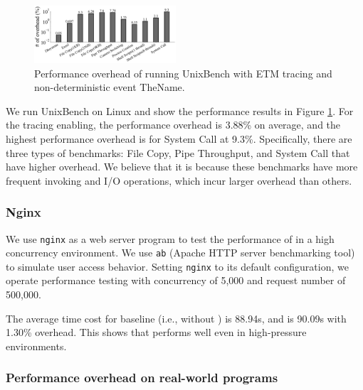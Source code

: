 \begin{figure}
    \centering
    \includegraphics[width=0.47\textwidth]{figures/unixbenchoverheadbar.pdf}
    \caption{Performance overhead of running UnixBench with ETM tracing and non-deterministic event TheName.}
    \label{fig:Performance overhead of running UnixBench}
\end{figure}

We run UnixBench on Linux and show the performance results in Figure
\ref{fig:Performance overhead of running UnixBench}. For the tracing enabling,
the performance overhead is 3.88\% on average, and the highest performance
overhead is for System Call at 9.3\%. Specifically, there are three types of
benchmarks: File Copy, Pipe Throughput, and System Call that have higher
overhead. We believe that it is because these benchmarks have more frequent
\syscall{} invoking and I/O operations, which incur larger overhead than others.

\subsubsection{Nginx} \label{subsec:eva-Performance-Nginx}

We use \texttt{nginx} \cite{nginx_1.20.0} as a web server program to test the
performance of \TheName in a high concurrency environment. We use \texttt{ab}
(Apache HTTP server benchmarking tool) \cite{ApacheBench} to simulate user
access behavior. Setting \texttt{nginx} to its default configuration, we operate
performance testing with concurrency of 5,000 and request number of 500,000.

The average time cost for baseline (i.e., without \TheName) is 88.94s, and
\TheName is 90.09s with 1.30\% overhead. This shows that \TheName performs well
even in high-pressure environments.

\subsubsection{Performance overhead on real-world programs} \label{subsec:eva-Performance-Normal}

